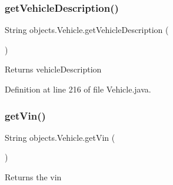 \begin{DoxyCode}{0}

\end{DoxyCode}
\mbox{\label{classobjects_1_1_vehicle_a08dfda8d36f4b5974d5cfd569930c8ef}} 
\subsubsection{\texorpdfstring{getVehicleDescription()}{getVehicleDescription()}}
{\footnotesize\ttfamily String objects.\+Vehicle.\+get\+Vehicle\+Description (\begin{DoxyParamCaption}{ }\end{DoxyParamCaption})}

\begin{DoxyReturn}{Returns}
vehicle\+Description 
\end{DoxyReturn}


Definition at line 216 of file Vehicle.\+java.


\begin{DoxyCode}{0}

\end{DoxyCode}
\mbox{\label{classobjects_1_1_vehicle_a477d9a6536cf3251fd8415df19634b4a}} 
\subsubsection{\texorpdfstring{getVin()}{getVin()}}
{\footnotesize\ttfamily String objects.\+Vehicle.\+get\+Vin (\begin{DoxyParamCaption}{ }\end{DoxyParamCaption})}

\begin{DoxyReturn}{Returns}
the vin 
\end{DoxyReturn}


